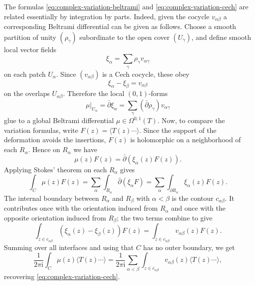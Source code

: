 \documentclass[12pt,letterpaper,reqno]{amsart}
\numberwithin{equation}{section}
\newcommand{\I}{{\mathrm i}}
\newcommand{\IP}[1]{\langle#1\rangle}
\begin{document}
The formulas \eqref{eq:complex-variation-beltrami} and \eqref{eq:complex-variation-cech} are related essentially
by integration by parts.
Indeed, given the cocycle $v_{\alpha \beta}$
a corresponding Beltrami differential can be given as
follows.
Choose a smooth partition of unity $(\rho_\gamma)$ subordinate to the open cover $(U_\gamma)$, and define smooth local vector fields
\begin{equation}
  \xi_\alpha = \sum_\gamma \rho_\gamma v_{\alpha \gamma}
\end{equation}
on each patch $U_\alpha$.
Since $(v_{\alpha \beta})$ is a Cech cocycle, these obey
\begin{equation}
  \xi_\alpha - \xi_\beta = v_{\alpha \beta}
\end{equation}
on the overlaps $U_{\alpha \beta}$.
Therefore the local $(0,1)$-forms
\begin{equation}
  \mu|_{U_\alpha} = \bar \partial \xi_\alpha = \sum_\gamma (\bar \partial \rho_\gamma) v_{\alpha \gamma}
\end{equation}
glue to a global Beltrami differential $\mu \in \Omega^{0,1}(T)$.
Now, to compare the variation formulas, write $F(z) = \IP{T(z) \cdots}$.
Since the support of the deformation avoids the insertions, $F(z)$ is holomorphic on a neighborhood of each $R_\alpha$.
Hence on $R_\alpha$ we have
\begin{equation}
  \mu(z) F(z) = \bar \partial (\xi_\alpha(z) F(z)) .
\end{equation}
Applying Stokes' theorem on each $R_\alpha$ gives
\begin{equation}
  \int_C \mu(z) F(z) = \sum_\alpha \int_{R_\alpha} \bar \partial (\xi_\alpha F)
  = \sum_\alpha \int_{\partial R_\alpha} \xi_\alpha(z) F(z) .
\end{equation}
The internal boundary between $R_\alpha$ and $R_\beta$ with $\alpha < \beta$ is the contour $c_{\alpha \beta}$.
It contributes once with the orientation induced from $R_\alpha$ and once with the opposite orientation induced from $R_\beta$; the two terms combine to give
\begin{equation}
  \int_{z \in c_{\alpha \beta}} (\xi_\alpha(z) - \xi_\beta(z)) F(z)
  = \int_{z \in c_{\alpha \beta}} v_{\alpha \beta}(z) F(z) .
\end{equation}
Summing over all interfaces and using that $C$ has no outer boundary, we get
\begin{equation}
  \frac{1}{2 \pi \I} \int_C \mu(z) \IP{T(z) \cdots}
  = \frac{1}{2 \pi \I} \sum_{\alpha < \beta} \int_{z \in c_{\alpha \beta}} v_{\alpha \beta}(z) \IP{T(z) \cdots},
\end{equation}
recovering \eqref{eq:complex-variation-cech}.
\end{document}
